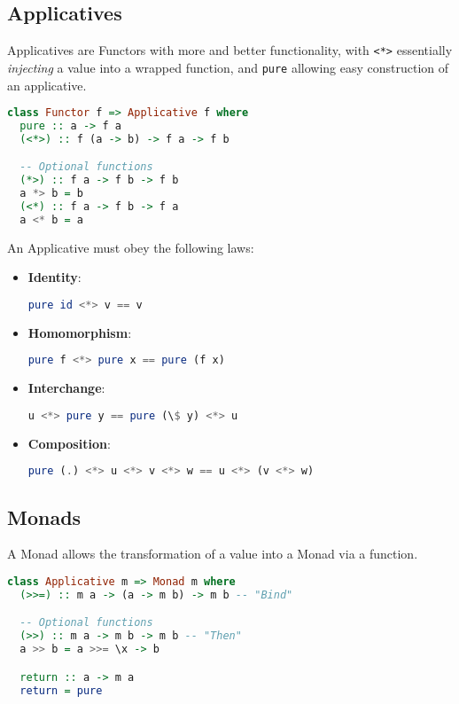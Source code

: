 \subsection{Applicatives}
Applicatives are Functors with more and better functionality, with \texttt{<*>} essentially \textit{injecting} a value into a wrapped function, and \texttt{pure} allowing easy construction of an applicative.

\begin{lstlisting}[language=haskell]
class Functor f => Applicative f where
  pure :: a -> f a
  (<*>) :: f (a -> b) -> f a -> f b

  -- Optional functions
  (*>) :: f a -> f b -> f b
  a *> b = b
  (<*) :: f a -> f b -> f a
  a <* b = a
\end{lstlisting}

An Applicative must obey the following laws:
\begin{itemize}
  \item \textbf{Identity}: \begin{lstlisting}[language=haskell]
pure id <*> v == v\end{lstlisting}
  \item \textbf{Homomorphism}: \begin{lstlisting}[language=haskell]
pure f <*> pure x == pure (f x)\end{lstlisting}
  \item \textbf{Interchange}: \begin{lstlisting}[language=haskell]
u <*> pure y == pure (\$ y) <*> u\end{lstlisting}
  \item \textbf{Composition}: \begin{lstlisting}[language=haskell]
pure (.) <*> u <*> v <*> w == u <*> (v <*> w)\end{lstlisting}
\end{itemize}

\subsection{Monads}
A Monad allows the transformation of a value into a Monad via a function.

\begin{lstlisting}[language=haskell]
class Applicative m => Monad m where
  (>>=) :: m a -> (a -> m b) -> m b -- "Bind"

  -- Optional functions
  (>>) :: m a -> m b -> m b -- "Then"
  a >> b = a >>= \x -> b

  return :: a -> m a
  return = pure
\end{lstlisting}

